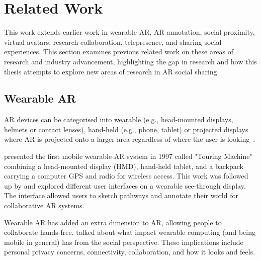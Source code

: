 \chapter{Related Work}
\label{ch:background}



This work extends earlier work in wearable AR, AR annotation, social proximity, virtual avatars, research collaboration, telepresence, and sharing social experiences. This section examines previous related work on these areas of research and industry advancement, highlighting the gap in research and how this thesis attempts to explore new areas of research in AR social sharing. 

\section{Wearable AR} 

AR devices can be categorised into wearable (e.g., head-mounted displays, helmets or contact lenses), hand-held (e.g., phone, tablet) or projected displays where AR is projected onto a larger area regardless of where the user is looking~\cite{Peddie2017}. 

\textcite{Feiner1997a} presented the first mobile wearable AR system in 1997 called "Touring Machine" combining a head-mounted display (HMD), hand-held tablet, and a backpack carrying a computer GPS and radio for wireless access. This work was followed up by \textcite{Hollerer1999a} and explored different user interfaces on a wearable see-through display. The interface allowed users to sketch pathways and annotate their world for collaborative AR systems. 

Wearable AR has added an extra dimension to AR, allowing people to collaborate hands-free. \textcite{Feiner1999} talked about what impact wearable computing (and being mobile in general) has from the social perspective. These implications include personal privacy concerns, connectivity, collaboration, and how it looks and feels. 

